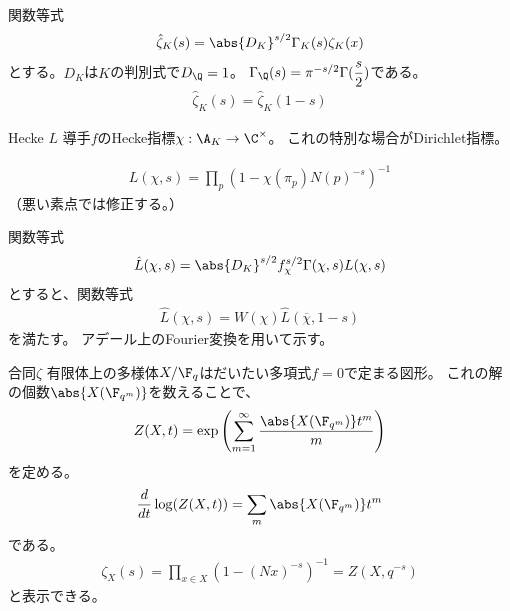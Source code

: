 \documentclass[dvipdfmx]{beamer}
\begin{document}
\begin{frame}{関数等式}
  \begin{align*}
    \hat{\zeta}_K(s)=\abs{D_K}^{s/2}\Gamma_K(s)\zeta_K(x)
  \end{align*}
  とする。$D_K$は$K$の判別式で$D_\Q=1$。
  $\Gamma_\Q(s)=\pi^{-s/2}\Gamma(\dfrac{s}{2})$である。
  \begin{align*}
    \hat{\zeta}_K(s)=\hat{\zeta}_K(1-s)
  \end{align*}
\end{frame}

\begin{frame}{Hecke $L$}
  導手$f$のHecke指標$\chi:\A_K \to \C^\times$。
  これの特別な場合がDirichlet指標。

  \begin{align*}
    L(\chi,s)=\prod_p(1-\chi(\pi_p)N(p)^{-s})^{-1}
  \end{align*}
      （悪い素点では修正する。）

\end{frame}

\begin{frame}{関数等式}    
  \begin{align*}
    \hat{L}(\chi,s)=\abs{D_K}^{s/2}f_\chi^{s/2}\Gamma(\chi,s)L(\chi,s)
  \end{align*}
  とすると、関数等式
  \begin{align*}
    \hat{L}(\chi,s)=W(\chi)\hat{L}(\overline{\chi},1-s)
  \end{align*}
  を満たす。
  アデール上のFourier変換を用いて示す。
\end{frame}

\begin{frame}{合同$\zeta$}
  有限体上の多様体$X/\F_q$はだいたい多項式$f=0$で定まる図形。
  これの解の個数$\abs{X(\F_{q^m})}$を数えることで、
  \begin{align*}
    Z(X,t)=\exp\left(\sum_{m=1}^\infty\frac{\abs{X(\F_{q^m})}t^m}{m}\right)
  \end{align*}
  を定める。
  \begin{align*}
    \frac{d}{dt}\log(Z(X,t))=\sum_m\abs{X(\F_{q^m})}t^m
  \end{align*}
  である。
  \begin{align*}
    \zeta_X(s)=\prod_{x\in X}(1-(Nx)^{-s})^{-1}=Z(X,q^{-s})
  \end{align*}
  と表示できる。
\end{frame}
\end{document}
